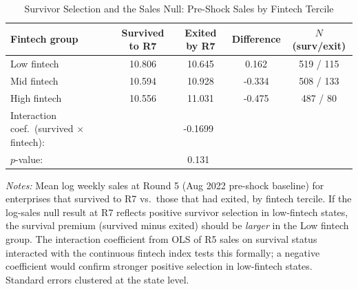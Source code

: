 \begin{table}[H]
\begin{threeparttable}
\caption{Survivor Selection and the Sales Null: Pre-Shock Sales by Fintech Tercile}
\label{atab:sales_decomp}
\small\begin{tabular}{lcccc}
\toprule
Fintech group & Survived to R7 & Exited by R7 & Difference & $N$ (surv/exit) \\
\midrule
Low fintech & 10.806 & 10.645 & 0.162 & 519 / 115 \\
Mid fintech & 10.594 & 10.928 & -0.334 & 508 / 133 \\
High fintech & 10.556 & 11.031 & -0.475 & 487 / 80 \\
\midrule
Interaction coef.\ (survived $\times$ fintech): & \multicolumn{3}{c}{-0.1699} & \\
$p$-value: & \multicolumn{3}{c}{0.131} & \\
\bottomrule
\end{tabular}
\begin{tablenotes}\footnotesize
\item \textit{Notes:} Mean log weekly sales at Round 5 (Aug 2022 pre-shock baseline) for enterprises that survived to R7 vs.\ those that had exited, by fintech tercile. If the log-sales null result at R7 reflects positive survivor selection in low-fintech states, the survival premium (survived minus exited) should be \emph{larger} in the Low fintech group. The interaction coefficient from OLS of R5 sales on survival status interacted with the continuous fintech index tests this formally; a negative coefficient would confirm stronger positive selection in low-fintech states. Standard errors clustered at the state level.
\end{tablenotes}\end{threeparttable}\end{table}
